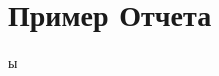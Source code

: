 \documentclass{mybook}
\begin{document}


\setcounter{page}{2}

\newpage
\tableofcontents
    
    \clearpage
    \chapter{Пример Отчета}
    
    ы

    \clearpage
    \printbibliography
\end{document}
